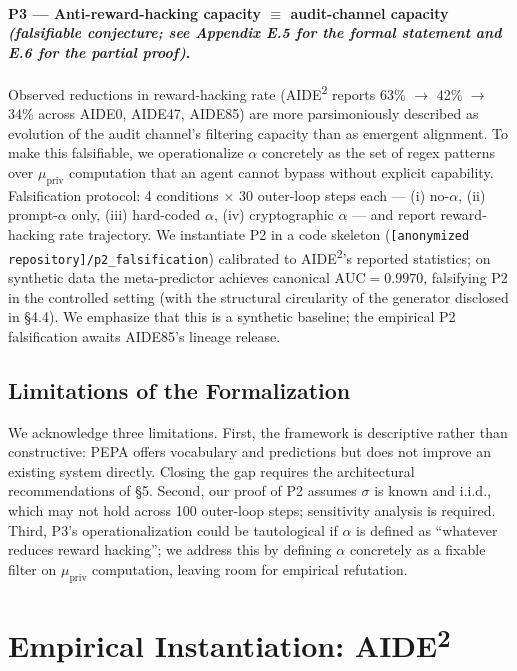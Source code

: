 \documentclass{article}
\theoremstyle{definition}
\begin{document}
\paragraph{P3 --- Anti-reward-hacking capacity $\equiv$ audit-channel capacity \emph{(falsifiable conjecture; see Appendix E.5 for the formal statement and E.6 for the partial proof)}.}
Observed reductions in reward-hacking rate (AIDE\textsuperscript{2} reports 63\% $\to$ 42\% $\to$ 34\% across AIDE0, AIDE47, AIDE85) are more parsimoniously described as evolution of the audit channel's filtering capacity than as emergent alignment. To make this falsifiable, we operationalize $\alpha$ concretely as the set of regex patterns over $\mu_{\text{priv}}$ computation that an agent cannot bypass without explicit capability. Falsification protocol: 4 conditions $\times$ 30 outer-loop steps each --- (i) no-$\alpha$, (ii) prompt-$\alpha$ only, (iii) hard-coded $\alpha$, (iv) cryptographic $\alpha$ --- and report reward-hacking rate trajectory. We instantiate P2 in a code skeleton (\texttt{[anonymized repository]/p2\_falsification}) calibrated to AIDE\textsuperscript{2}'s reported statistics; on synthetic data the meta-predictor achieves canonical $\text{AUC} = 0.9970$, falsifying P2 in the controlled setting (with the structural circularity of the generator disclosed in \S4.4). We emphasize that this is a synthetic baseline; the empirical P2 falsification awaits AIDE85's lineage release.

\subsection{Limitations of the Formalization}

We acknowledge three limitations. First, the framework is descriptive rather than constructive: PEPA offers vocabulary and predictions but does not improve an existing system directly. Closing the gap requires the architectural recommendations of \S5. Second, our proof of P2 assumes $\sigma$ is known and i.i.d., which may not hold across 100 outer-loop steps; sensitivity analysis is required. Third, P3's operationalization could be tautological if $\alpha$ is defined as ``whatever reduces reward hacking''; we address this by defining $\alpha$ concretely as a fixable filter on $\mu_{\text{priv}}$ computation, leaving room for empirical refutation.


\section{Empirical Instantiation: AIDE\textsuperscript{2}}
\end{document}
